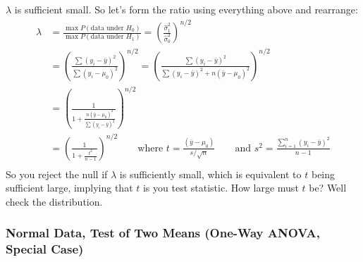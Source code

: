\documentclass[a4paper,12pt]{scrartcl}
\begin{document}
$\lambda$ is sufficient small. So let's form the ratio using
everything above and rearrange:
\begin{align*}
   \lambda &= \frac{\max P(\text{data under $H_0$})}{
      \max P(\text{data under $H_1$})} = \left(
      \frac{\hat{\sigma}_1^2}{\hat{\sigma}_0^2}\right)^{n/2}\\
   &= \left( \frac{\sum (y_i - \bar{y})^2}{\sum (y_i - \mu_0)^2}
      \right)^{n/2}
   = \left( \frac{\sum (y_i - \bar{y})^2}{\sum (y_i - \bar{y})^2 +
   n(\bar{y} - \mu_0)^2}
      \right)^{n/2}\\
   &= \left( \frac{1}{1 + \frac{n(\bar{y} - \mu_0)^2}{
      \sum (y_i - \bar{y})^2 }}
      \right)^{n/2}\\
   &= \left( \frac{1}{1 + \frac{t^2}{n-1}}
   \right)^{n/2} \qquad \text{where }
   t = \frac{(\bar{y}-\mu_0)}{s/\sqrt{n}}\qquad
   \text{and } s^2 = \frac{\sum^n_{i=1} (y_i - \bar{y})^2}{n-1} \\
\end{align*}
So you reject the null if $\lambda$ is sufficiently small, which
is equivalent to $t$ being sufficient large, implying that $t$ is you
test statistic. How large must $t$ be? Well check the distribution.

\newpage
\subsubsection{Normal Data, Test of Two Means (One-Way ANOVA, Special
   Case)}
\end{document}
